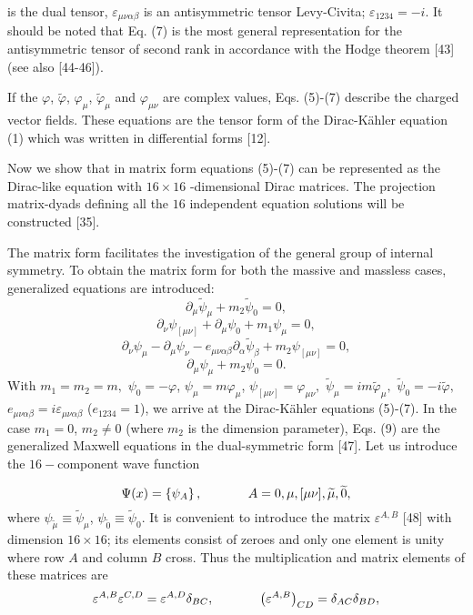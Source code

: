 \documentclass[a4paper,12pt]{article}
\begin{document}
is the dual tensor, $\varepsilon _{\mu \nu \alpha \beta }$ is an
antisymmetric tensor Levy-Civita; $\varepsilon _{1234}=-i$. It should be
noted that Eq. (7) is the most general representation for the antisymmetric
tensor of second rank in accordance with the Hodge theorem [43] (see also
[44-46]).

If the $\varphi $, $\widetilde{\varphi }$, $\varphi _\mu $,
$\widetilde{ \varphi }_\mu $ and $\varphi _{\mu \nu }$ are complex
values, Eqs. (5)-(7) describe the charged vector fields. These
equations are the tensor form of the Dirac-K\"ahler equation (1)
which was written in differential forms [12].

Now we show that in matrix form equations (5)-(7) can be represented as the
Dirac-like equation with $16\times 16$ -dimensional Dirac matrices. The
projection matrix-dyads defining all the $16$ independent equation solutions
will be constructed [35].

The matrix form facilitates the investigation of the general group of
internal symmetry. To obtain the matrix form for both the massive and
massless cases, generalized equations are introduced:
\[
\partial _\mu \widetilde{\psi }_\mu +m_2\widetilde{\psi }_0=0 ,
\]
\[
\partial _\nu \psi _{[\mu \nu ]}+\partial _\mu \psi _0+m_1\psi _\mu
=0 ,
\]
\vspace{-8mm}
\begin{equation}  \label{9}
\end{equation}
\vspace{-8mm}
\[
\partial _\nu \psi _\mu -\partial _\mu \psi _\nu -e_{\mu \nu \alpha \beta
}\partial _\alpha \widetilde{\psi }_\beta +m_2\psi _{[\mu \nu ]}=0
,
\]
\[
\partial _\mu \psi _\mu +m_2\psi _0=0 .
\]
With $m_1=m_2=m,$ $\psi _0=-\varphi $, $\psi _\mu =m\varphi _\mu
$, $\psi _{[\mu \nu ]}=\varphi _{\mu \nu },$ $\widetilde{\psi
}_\mu =im\widetilde{ \varphi }_\mu ,$ $\widetilde{\psi
}_0=-i\widetilde{\varphi },$ $e_{\mu \nu \alpha \beta
}=i\varepsilon _{\mu \nu \alpha \beta }$ ($e_{1234}=1$), we arrive
at the Dirac-K\"ahler equations (5)-(7). In the case $m_1=0$, $
m_2\neq 0$ (where $m_2$ is the dimension parameter), Eqs. (9) are
the generalized Maxwell equations in the dual-symmetric form [47].
Let us introduce the $16-$component wave function

\begin{equation}
\Psi (x)=\left\{ \psi _A\right\} ,\hspace{0.5in}A=0,\mu ,[\mu \nu
], \widetilde{\mu },\widetilde{0} , \label{10}
\end{equation}
where $\psi _{\widetilde{\mu}}\equiv\widetilde{\psi}_\mu$, $\psi
_{\widetilde{0}}\equiv\widetilde{\psi}_0$. It is convenient to
introduce the matrix $\varepsilon ^{A,B}$ [48] with dimension
$16\times 16$; its elements consist of zeroes and only one element
is unity where row $A$ and column $B$ cross. Thus the
multiplication and matrix elements of these matrices are
\begin{equation}
\varepsilon ^{A,B}\varepsilon ^{C,D}=\varepsilon ^{A,D}\delta
_{BC} ,\hspace{0.5in}\left( \varepsilon ^{A,B}\right) _{CD}=\delta
_{AC}\delta _{BD} ,\label{11}
\end{equation}
\end{document}
